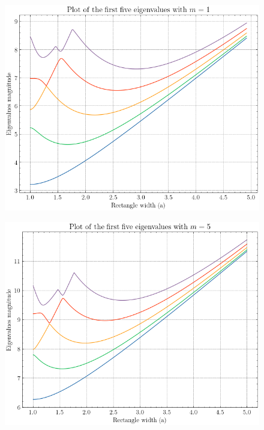 \begin{figure}[!htb]
    \centering
    \begin{minipage}{.5\textwidth}
      \centering
      \includegraphics[width=\linewidth]{Images/Dirac/quad/eigenvalues_rectangle_width_m_1.png}
      \captionsetup{width=0.9\linewidth} %
      \label{eigenvalues_rectangle_width_m_1}
    \end{minipage}%
    \begin{minipage}{.5\textwidth}
      \centering
      \includegraphics[width=1\linewidth]{Images/Dirac/quad/eigenvalues_rectangle_width_m_5.png}
      \captionsetup{width=0.9\linewidth} %
      \label{eigenvalues_rectangle_width_m_5}
    \end{minipage}
\end{figure}

